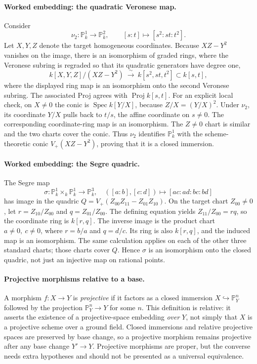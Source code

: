 \paragraph{Worked embedding: the quadratic Veronese map.}
Consider
\[
 \nu_2:\mathbb P_k^1\longrightarrow\mathbb P_k^2,
       \qquad[s:t]\longmapsto[s^2:st:t^2].
\]
Let \(X,Y,Z\) denote the target homogeneous coordinates.
Because \(XZ-Y^2\) vanishes on the image, there is an
isomorphism of graded rings, where the Veronese subring is
regraded so that its quadratic generators have degree one,
\[
 k[X,Y,Z]/(XZ-Y^2)\ \xrightarrow{\ \sim\ }\ k[s^2,st,t^2]
       \subset k[s,t],
\]
where the displayed ring map is an isomorphism onto the second
Veronese subring.  The associated Proj agrees with
\(\operatorname{Proj}k[s,t]\).  For an explicit local check, on
\(X\ne0\) the conic is \(\operatorname{Spec}k[Y/X]\), because
\(Z/X=(Y/X)^2\).  Under \(\nu_2\), its coordinate \(Y/X\)
pulls back to \(t/s\), the affine coordinate on \(s\ne0\).
The corresponding coordinate-ring map is an isomorphism.
The \(Z\ne0\) chart is similar and the two charts cover the conic.
Thus \(\nu_2\) identifies \(\mathbb P_k^1\) with the
scheme-theoretic conic \(V_+(XZ-Y^2)\), proving that it is a
closed immersion.

\paragraph{Worked embedding: the Segre quadric.}
The Segre map
\[
 \sigma:\mathbb P_k^1\times_k\mathbb P_k^1\to\mathbb P_k^3,
 \quad([a:b],[c:d])\mapsto[ac:ad:bc:bd]
\]
has image in the quadric
\(Q=V_+(Z_{00}Z_{11}-Z_{01}Z_{10})\).
On the target chart \(Z_{00}\ne0\), let
\(r=Z_{10}/Z_{00}\) and \(q=Z_{01}/Z_{00}\).
The defining equation yields
\(Z_{11}/Z_{00}=rq\), so the coordinate ring is \(k[r,q]\).
The inverse image is the product chart \(a\ne0,\ c\ne0\),
where \(r=b/a\) and \(q=d/c\).  Its ring is also \(k[r,q]\),
and the induced map is an isomorphism.
The same calculation applies on each of the other three standard
charts; those charts cover \(Q\).  Hence \(\sigma\) is an
isomorphism onto the closed quadric, not just an injective map on
rational points.

\paragraph{Projective morphisms relative to a base.}
A morphism \(f:X\to Y\) is \emph{projective} if it factors as
a closed immersion \(X\hookrightarrow\mathbb P_Y^n\) followed
by the projection \(\mathbb P_Y^n\to Y\) for some \(n\).
This definition is relative: it asserts the existence of a
projective-space embedding \emph{over} \(Y\), not simply that
\(X\) is a projective scheme over a ground field.
Closed immersions and relative projective spaces are preserved by
base change, so a projective morphism remains projective after
any base change \(Y'\to Y\).  Projective morphisms are proper,
but the converse needs extra hypotheses and should not be
presented as a universal equivalence.
